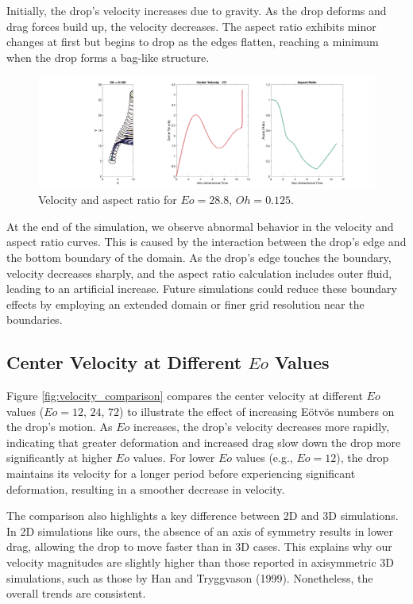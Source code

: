 \documentclass[12pt]{article}
\begin{document}
Initially, the drop's velocity increases due to gravity. As the drop deforms and drag forces build up, the velocity decreases. The aspect ratio exhibits minor changes at first but begins to drop as the edges flatten, reaching a minimum when the drop forms a bag-like structure.

\begin{figure}[H]
    \centering
    \includegraphics[width=\textwidth]{Latex/figures/All_Oh=1.25_t=0.44.png}
    \caption{Velocity and aspect ratio for $Eo = 28.8$, $Oh = 0.125$.}
    \label{fig:velocity_aspect}
\end{figure}

At the end of the simulation, we observe abnormal behavior in the velocity and aspect ratio curves. This is caused by the interaction between the drop's edge and the bottom boundary of the domain. As the drop's edge touches the boundary, velocity decreases sharply, and the aspect ratio calculation includes outer fluid, leading to an artificial increase. Future simulations could reduce these boundary effects by employing an extended domain or finer grid resolution near the boundaries.


\subsection{Center Velocity at Different $Eo$ Values}
Figure \ref{fig:velocity_comparison} compares the center velocity at different $Eo$ values ($Eo = 12$, $24$, $72$) to illustrate the effect of increasing Eötvös numbers on the drop’s motion. As $Eo$ increases, the drop's velocity decreases more rapidly, indicating that greater deformation and increased drag slow down the drop more significantly at higher $Eo$ values. For lower $Eo$ values (e.g., $Eo = 12$), the drop maintains its velocity for a longer period before experiencing significant deformation, resulting in a smoother decrease in velocity.

The comparison also highlights a key difference between 2D and 3D simulations. In 2D simulations like ours, the absence of an axis of symmetry results in lower drag, allowing the drop to move faster than in 3D cases. This explains why our velocity magnitudes are slightly higher than those reported in axisymmetric 3D simulations, such as those by Han and Tryggvason (1999). Nonetheless, the overall trends are consistent.
\end{document}
